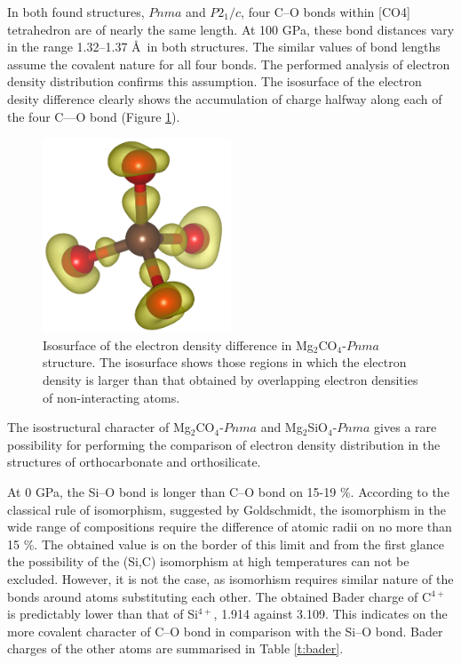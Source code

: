 \documentclass[a4paperm]{article}
\begin{document}
In both found structures, $Pnma$ and $P2_1/c$, four C--O bonds within [CO4] tetrahedron are of nearly the same length.
At 100 GPa, these bond distances vary in the range 1.32--1.37 \AA\ in both structures. 
The similar values of bond lengths assume the covalent nature for all four bonds.
The performed analysis of electron density distribution confirms this assumption.
The isosurface of the electron desity difference clearly shows the accumulation of charge halfway along each of the four C—O bond (Figure \ref{diff}).


\begin{figure}[H]
	\includegraphics[width=0.5\textwidth]{dens_diff.png} \centering
	\caption{Isosurface of the electron density difference in Mg$_2$CO$_4$-$Pnma$ structure. The isosurface shows those regions in which the electron density is larger than that obtained by overlapping electron densities of non-interacting atoms.} \label{diff}
\end{figure}

The isostructural character of Mg$_2$CO$_4$-$Pnma$ and Mg$_2$SiO$_4$-$Pnma$ gives a rare possibility for performing the comparison of electron density distribution in the structures of orthocarbonate and orthosilicate.

At 0 GPa, the Si--O bond is longer than C--O bond on 15-19 \%.
According to the classical rule of isomorphism, suggested by Goldschmidt, the isomorphism in the wide range of compositions require the difference of atomic radii on no more than 15 \%.
The obtained value is on the border of this limit and from the first glance the possibility of the (Si,C) isomorphism at high temperatures can not be excluded.
However, it is not the case, as isomorhism requires similar nature of the bonds around atoms substituting each other.
The obtained Bader charge of C$^{4+}$ is predictably lower than that of Si$^{4+}$, 1.914 against 3.109. 
This indicates on the more covalent character of C--O bond in comparison with the Si--O bond.
Bader charges of the other atoms are summarised in Table \ref{t:bader}.
\end{document}
